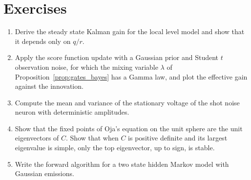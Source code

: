 \section*{Exercises}
\begin{enumerate}
\item Derive the steady state Kalman gain for the local level model and show that it depends only on $q/r$.
\item Apply the score function update with a Gaussian prior and Student $t$ observation noise, for which the mixing variable $\lambda$ of Proposition~\ref{prop:gates_bayes} has a Gamma law, and plot the effective gain against the innovation.
\item Compute the mean and variance of the stationary voltage of the shot noise neuron with deterministic amplitudes.
\item Show that the fixed points of Oja's equation on the unit sphere are the unit eigenvectors of $C$. Show that when $C$ is positive definite and its largest eigenvalue is simple, only the top eigenvector, up to sign, is stable.
\item Write the forward algorithm for a two state hidden Markov model with Gaussian emissions.
\end{enumerate}
